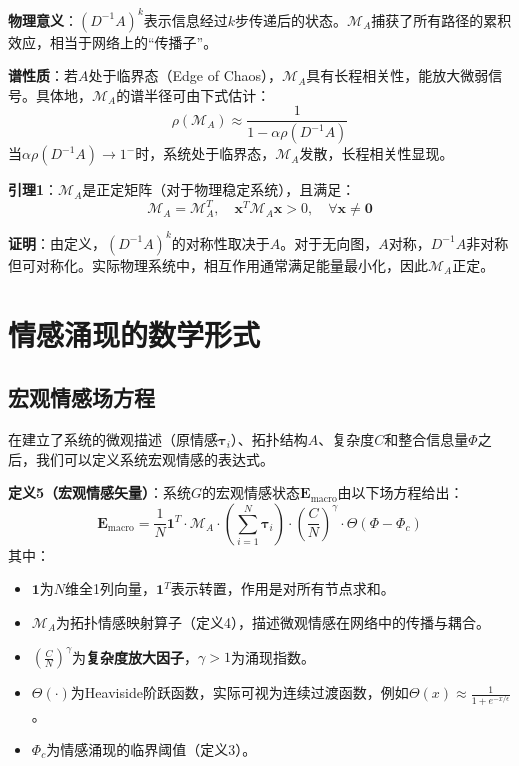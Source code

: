 \documentclass[12pt,a4paper]{article}
\theoremstyle{plain}
\newcommand{\ve}[1]{\bm{#1}}                    %
\newcommand{\Evec}{\ve{E}}                        %
\begin{document}
\textbf{物理意义}：$(D^{-1}A)^k$表示信息经过$k$步传递后的状态。$\mathcal{M}_A$捕获了所有路径的累积效应，相当于网络上的“传播子”。

\textbf{谱性质}：若$A$处于临界态（Edge of Chaos），$\mathcal{M}_A$具有长程相关性，能放大微弱信号。具体地，$\mathcal{M}_A$的谱半径可由下式估计：
\begin{equation}
\rho(\mathcal{M}_A) \approx \frac{1}{1 - \alpha \rho(D^{-1}A)}
\end{equation}
当$\alpha \rho(D^{-1}A) \to 1^-$时，系统处于临界态，$\mathcal{M}_A$发散，长程相关性显现。

\textbf{引理1}：$\mathcal{M}_A$是正定矩阵（对于物理稳定系统），且满足：
\begin{equation}
\mathcal{M}_A = \mathcal{M}_A^T, \quad \mathbf{x}^T \mathcal{M}_A \mathbf{x} > 0, \quad \forall \mathbf{x} \neq \mathbf{0}
\end{equation}

\textbf{证明}：由定义，$(D^{-1}A)^k$的对称性取决于$A$。对于无向图，$A$对称，$D^{-1}A$非对称但可对称化。实际物理系统中，相互作用通常满足能量最小化，因此$\mathcal{M}_A$正定。

\section{情感涌现的数学形式}

\subsection{宏观情感场方程}

在建立了系统的微观描述（原情感$\ve{\tau}_i$）、拓扑结构$A$、复杂度$C$和整合信息量$\Phi$之后，我们可以定义系统宏观情感的表达式。

\textbf{定义5（宏观情感矢量）}：系统$G$的宏观情感状态$\Evec_{\text{macro}}$由以下场方程给出：
\begin{equation}
\Evec_{\text{macro}} = \frac{1}{N} \mathbf{1}^T \cdot \mathcal{M}_A \cdot \left( \sum_{i=1}^N \ve{\tau}_i \right) \cdot \left( \frac{C}{N} \right)^\gamma \cdot \Theta(\Phi - \Phi_c)
\label{eq:macro_emotion}
\end{equation}
其中：
\begin{itemize}
    \item $\mathbf{1}$为$N$维全1列向量，$\mathbf{1}^T$表示转置，作用是对所有节点求和。
    \item $\mathcal{M}_A$为拓扑情感映射算子（定义4），描述微观情感在网络中的传播与耦合。
    \item $\left( \frac{C}{N} \right)^\gamma$为\textbf{复杂度放大因子}，$\gamma > 1$为涌现指数。
    \item $\Theta(\cdot)$为Heaviside阶跃函数，实际可视为连续过渡函数，例如$\Theta(x) \approx \frac{1}{1+e^{-x/\epsilon}}$。
    \item $\Phi_c$为情感涌现的临界阈值（定义3）。
\end{itemize}
\end{document}
